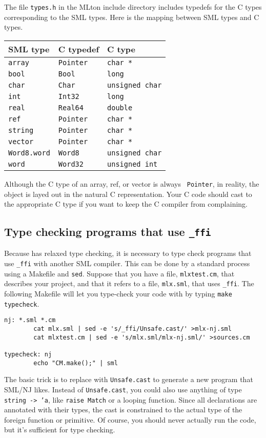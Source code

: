 The file {\tt types.h} in the MLton include directory includes
typedefs for the C types corresponding to the SML types.
Here is the mapping between SML types and C types.

\begin{center}
\begin{tabular}{lll}
SML type & C typedef & C type\\
\hline
{\tt array} & {\tt Pointer} & {\tt char *} \\
{\tt bool} & {\tt Bool} & {\tt long} \\
{\tt char} & {\tt Char} & {\tt unsigned char} \\
{\tt int} & {\tt Int32} & {\tt long} \\
{\tt real} & {\tt Real64} & {\tt double} \\
{\tt ref} & {\tt Pointer} & {\tt char *} \\
{\tt string} & {\tt Pointer} & {\tt char *} \\
{\tt vector} & {\tt Pointer} & {\tt char *} \\
{\tt Word8.word} & {\tt Word8} & {\tt unsigned char} \\
{\tt word} & {\tt Word32} & {\tt unsigned int} \\
\end{tabular}
\end{center}

Although the C type of an array, ref, or vector is always {\tt
Pointer}, in reality, the object is layed out in the natural C
representation.  Your C code should cast to the appropriate C type if
you want to keep the C compiler from complaining.

\subsection{Type checking programs that use {\tt \_ffi}}

Because {\mlton} has relaxed type checking, it is necessary to
type check programs that use {\tt \_ffi} with another SML compiler.
This can be done by a standard process using a Makefile and {\tt sed}.
Suppose that you have a file, {\tt mlxtest.cm}, that describes your
{\mlton} project, and that it refers to a file, {\tt mlx.sml}, that
uses {\tt \_ffi}.  The following Makefile will let you type-check your
code with {\smlnj} by typing {\tt make typecheck}.

\begin{verbatim}
nj: *.sml *.cm
        cat mlx.sml | sed -e 's/_ffi/Unsafe.cast/' >mlx-nj.sml
        cat mlxtest.cm | sed -e 's/mlx.sml/mlx-nj.sml/' >sources.cm

typecheck: nj
        echo "CM.make();" | sml
\end{verbatim}

The basic trick is to replace {\ffi} with {\tt Unsafe.cast} to generate a new
program that SML/NJ likes.  Instead of {\tt Unsafe.cast}, you could also use
anything of type {\tt string -> 'a}, like {\tt raise Match} or a looping
function.  Since all {\ffi} declarations are annotated with their types, the
cast is constrained to the actual type of the foreign function or primitive. Of
course, you should never actually run the code, but it's sufficient for type
checking.
